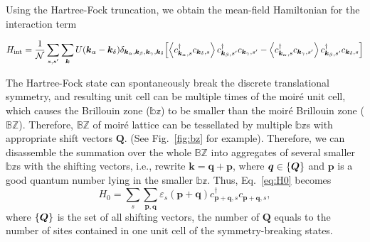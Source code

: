 \documentclass[aps,prl,floatfix,twocolumn]{revtex4-1}
\begin{document}
Using the Hartree-Fock truncation, we obtain the mean-field Hamiltonian for the interaction term
\begin{widetext}
	\begin{equation}\label{eq:HMF}
		H_{\text{int}}=\frac{1}{\mathcal{N}} \sum_{s,s'} \sum_{\bm{k}} U(\bm{k}_\alpha-\bm{k}_\delta) \delta_{\bm{k}_\alpha,\bm{k}_\beta,\bm{k}_\gamma,\bm{k}_\delta} \\
		\qty[\expval{c_{\bm{k}_\alpha,s}^\dagger c_{\bm{k}_\delta,s}}c_{\bm{k}_\beta,s'}^\dagger c_{\bm{k}_\gamma,s'}-\expval{c_{\bm{k}_\alpha,s}^\dagger c_{\bm{k}_\gamma,s'}}c_{\bm{k}_\beta,s'}^\dagger c_{\bm{k}_\delta,s}]
	\end{equation}
\end{widetext}

The Hartree-Fock state can spontaneously break the discrete translational symmetry, and resulting unit cell can be multiple times of the moir\'e unit cell, which causes the Brillouin zone ($ \mathbb{bz} $) to be smaller than the moir\'e Brillouin zone ($\mathbb{BZ}$). Therefore, $\mathbb{BZ}$ of moir\'e lattice can be tessellated by multiple $ \mathbb{bz} $s with appropriate shift vectors $ \bm{Q} $. (See Fig.~\ref{fig:bz} for example). Therefore, we can disassemble the summation over the whole $\mathbb{BZ}$ into aggregates  of several smaller  $ \mathbb{bz} $s with the shifting vectors, i.e., rewrite $ \bm{k}=\bm{q}+\bm{p} $, where $ \bm{q}\in \qty{\bm{Q}} $ and $ \bm{p} $ is a good quantum number lying in the smaller $ \mathbb{bz} $. Thus, Eq.~\eqref{eq:H0} becomes
\begin{equation}\label{eq:H0q}
	H_0= \sum_{s} \sum_{\bm{p},\bm{q}} \varepsilon_s(\bm{p}+\bm{q}) c_{\bm{p}+\bm{q},s}^\dagger c_{\bm{p}+\bm{q},s},
\end{equation}
where $ \qty{\bm{Q}} $ is the set of all shifting vectors, the number of $ \bm{Q} $ equals to the number of sites contained in one unit cell of the symmetry-breaking states.
\end{document}
